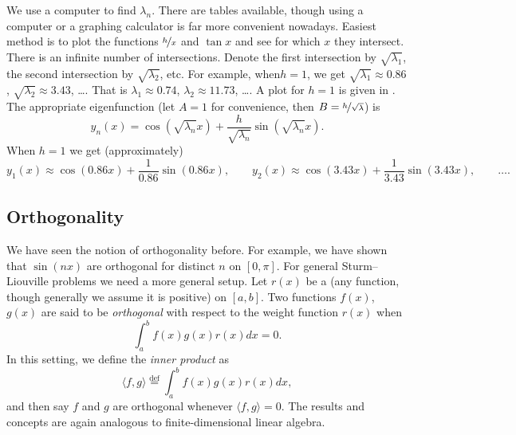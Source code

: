 \documentclass{ximera}
\begin{document}
\begin{example}
    We use a computer to find $\lambda_n$.  There are tables available, though using a computer or a graphing calculator is far more convenient nowadays. Easiest method is to plot the functions $\nicefrac{h}{x}$ and $\tan x$ and see for which $x$ they intersect. There is an infinite number of intersections.  Denote the first intersection by $\sqrt{\lambda_1}$, the second intersection by $\sqrt{\lambda_2}$, etc. For example, when$h=1$, we get $\sqrt{\lambda_1} \approx 0.86$,  $\sqrt{\lambda_2} \approx 3.43$, \ldots. That is $\lambda_1 \approx 0.74$, $\lambda_2 \approx 11.73$, \ldots. A plot for $h=1$ is given in . The appropriate eigenfunction (let $A = 1$ for convenience, then $B=\nicefrac{h}{\sqrt{\lambda}}$) is
    \begin{equation*}
        y_n(x) = \cos ( \sqrt{\lambda_n} x ) + \frac{h}{\sqrt{\lambda_n}} \sin (\sqrt{\lambda_n}  x ) .
    \end{equation*}
    When $h=1$ we get (approximately)
    \begin{equation*}
        y_1(x) \approx \cos (0.86 x ) + \frac{1}{0.86} \sin (0.86  x ) , \qquad
        y_2(x) \approx \cos (3.43 x ) + \frac{1}{3.43} \sin (3.43  x ) , \qquad \ldots .
    \end{equation*}
    \begin{myfig}
        \capstart
        \caption{Plot of $\frac{1}{x}$ and $\tan x$.%
        \label{sl:tanx1overxfig}}
    \end{myfig}
\end{example}

\subsection{Orthogonality}

We have seen the notion of orthogonality before.  For example, we have shown that $\sin (nx)$ are orthogonal for distinct $n$ on $[0,\pi]$. For general Sturm--Liouville problems we need a more general setup. Let $r(x)$ be a \emph{} (any function, though generally we assume it is positive) on $[a,b]$.  Two functions $f(x)$, $g(x)$ are said to be \emph{orthogonal} with respect to the weight function $r(x)$ when
\begin{equation*}
    \int_a^b f(x)  g(x)  r(x) dx = 0 .
\end{equation*}
In this setting, we define the \emph{inner product} as
\begin{equation*}
    \langle f , g \rangle \overset{\text{def}}{=} \int_a^b f(x)  g(x)  r(x) dx ,
\end{equation*}
and then say $f$ and $g$ are orthogonal whenever $\langle f , g \rangle = 0$. The results and concepts are again analogous to finite-dimensional linear algebra.
\end{document}
